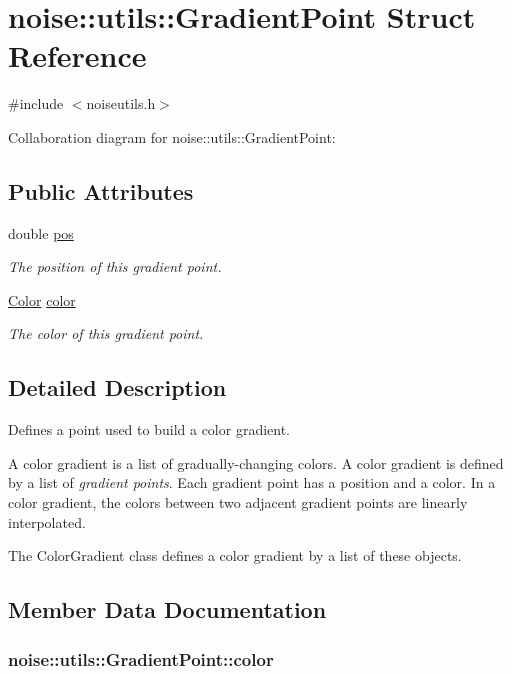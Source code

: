 \hypertarget{structnoise_1_1utils_1_1_gradient_point}{\section{noise\+:\+:utils\+:\+:Gradient\+Point Struct Reference}
\label{structnoise_1_1utils_1_1_gradient_point}
}


{\ttfamily \#include $<$noiseutils.\+h$>$}



Collaboration diagram for noise\+:\+:utils\+:\+:Gradient\+Point\+:
\subsection*{Public Attributes}
\begin{DoxyCompactItemize}
\item 
double \hyperlink{structnoise_1_1utils_1_1_gradient_point_ab47a3602fe5727745eb01c46068511bb}{pos}
\begin{DoxyCompactList}\small\item\em The position of this gradient point. \end{DoxyCompactList}\item 
\hyperlink{classnoise_1_1utils_1_1_color}{Color} \hyperlink{structnoise_1_1utils_1_1_gradient_point_ab2949090d09f62737077fb26873a9fc8}{color}
\begin{DoxyCompactList}\small\item\em The color of this gradient point. \end{DoxyCompactList}\end{DoxyCompactItemize}


\subsection{Detailed Description}
Defines a point used to build a color gradient.

A color gradient is a list of gradually-\/changing colors. A color gradient is defined by a list of {\itshape gradient points}. Each gradient point has a position and a color. In a color gradient, the colors between two adjacent gradient points are linearly interpolated.

The Color\+Gradient class defines a color gradient by a list of these objects. 

\subsection{Member Data Documentation}
\hypertarget{structnoise_1_1utils_1_1_gradient_point_ab2949090d09f62737077fb26873a9fc8}{
\subsubsection[{color}]{ noise\+::utils\+::\+Gradient\+Point\+::color}}\label{structnoise_1_1utils_1_1_gradient_point_ab2949090d09f62737077fb26873a9fc8}



